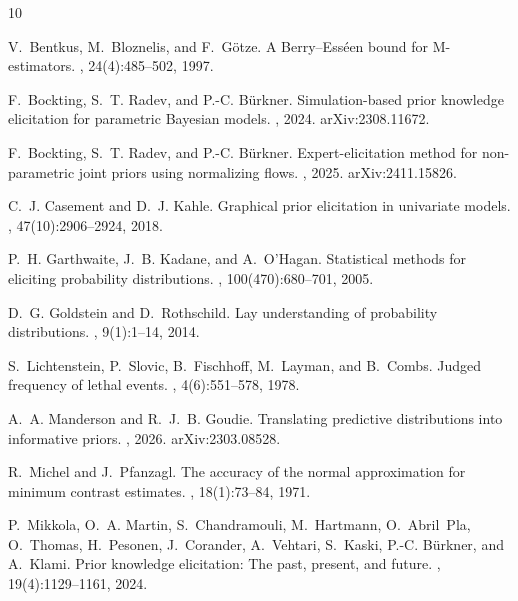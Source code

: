 \documentclass[11pt]{article}
\theoremstyle{remark}
\begin{document}
\begin{thebibliography}{10}

V.~Bentkus, M.~Bloznelis, and F.~G{\"o}tze.
\newblock A {B}erry--{E}ss{\'e}en bound for {M}-estimators.
, 24(4):485--502, 1997.

F.~Bockting, S.~T. Radev, and P.-C. B{\"u}rkner.
\newblock Simulation-based prior knowledge elicitation for parametric
  {B}ayesian models.
, 2024.
\newblock arXiv:2308.11672.

F.~Bockting, S.~T. Radev, and P.-C. B{\"u}rkner.
\newblock Expert-elicitation method for non-parametric joint priors using
  normalizing flows.
, 2025.
\newblock arXiv:2411.15826.

C.~J. Casement and D.~J. Kahle.
\newblock Graphical prior elicitation in univariate models.
,
  47(10):2906--2924, 2018.

P.~H. Garthwaite, J.~B. Kadane, and A.~O'Hagan.
\newblock Statistical methods for eliciting probability distributions.
,
  100(470):680--701, 2005.

D.~G. Goldstein and D.~Rothschild.
\newblock Lay understanding of probability distributions.
, 9(1):1--14, 2014.

S.~Lichtenstein, P.~Slovic, B.~Fischhoff, M.~Layman, and B.~Combs.
\newblock Judged frequency of lethal events.
,
  4(6):551--578, 1978.

A.~A. Manderson and R.~J.~B. Goudie.
\newblock Translating predictive distributions into informative priors.
, 2026.
\newblock arXiv:2303.08528.

R.~Michel and J.~Pfanzagl.
\newblock The accuracy of the normal approximation for minimum contrast
  estimates.
, 18(1):73--84, 1971.

P.~Mikkola, O.~A. Martin, S.~Chandramouli, M.~Hartmann, O.~Abril~Pla,
  O.~Thomas, H.~Pesonen, J.~Corander, A.~Vehtari, S.~Kaski, P.-C. B{\"u}rkner,
  and A.~Klami.
\newblock Prior knowledge elicitation: The past, present, and future.
, 19(4):1129--1161, 2024.


\end{thebibliography}
\end{document}
